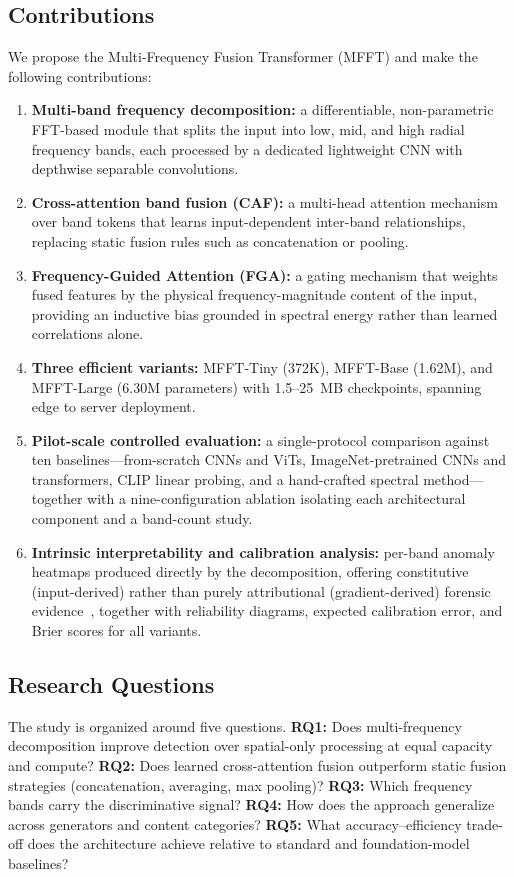\documentclass[journal]{IEEEtran}
\begin{document}
\subsection{Contributions}
We propose the Multi-Frequency Fusion Transformer (MFFT) and make the following contributions:
\begin{enumerate}
    \item \textbf{Multi-band frequency decomposition:} a differentiable, non-parametric FFT-based module that splits the input into low, mid, and high radial frequency bands, each processed by a dedicated lightweight CNN with depthwise separable convolutions.
    \item \textbf{Cross-attention band fusion (CAF):} a multi-head attention mechanism over band tokens that learns input-dependent inter-band relationships, replacing static fusion rules such as concatenation or pooling.
    \item \textbf{Frequency-Guided Attention (FGA):} a gating mechanism that weights fused features by the physical frequency-magnitude content of the input, providing an inductive bias grounded in spectral energy rather than learned correlations alone.
    \item \textbf{Three efficient variants:} MFFT-Tiny (372K), MFFT-Base (1.62M), and MFFT-Large (6.30M parameters) with 1.5--25~MB checkpoints, spanning edge to server deployment.
    \item \textbf{Pilot-scale controlled evaluation:} a single-protocol comparison against ten baselines---from-scratch CNNs and ViTs, ImageNet-pretrained CNNs and transformers, CLIP linear probing, and a hand-crafted spectral method---together with a nine-configuration ablation isolating each architectural component and a band-count study.
    \item \textbf{Intrinsic interpretability and calibration analysis:} per-band anomaly heatmaps produced directly by the decomposition, offering constitutive (input-derived) rather than purely attributional (gradient-derived) forensic evidence~\cite{selvaraju2017}, together with reliability diagrams, expected calibration error, and Brier scores for all variants.
\end{enumerate}

\subsection{Research Questions}
The study is organized around five questions. \textbf{RQ1:} Does multi-frequency decomposition improve detection over spatial-only processing at equal capacity and compute? \textbf{RQ2:} Does learned cross-attention fusion outperform static fusion strategies (concatenation, averaging, max pooling)? \textbf{RQ3:} Which frequency bands carry the discriminative signal? \textbf{RQ4:} How does the approach generalize across generators and content categories? \textbf{RQ5:} What accuracy--efficiency trade-off does the architecture achieve relative to standard and foundation-model baselines?
\end{document}
